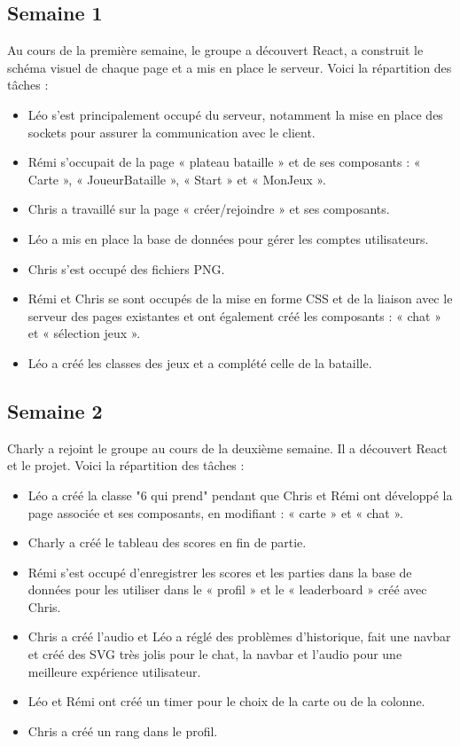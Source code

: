 \documentclass[a4paper]{article}
\begin{document}
\subsection{Semaine 1}

Au cours de la première semaine, le groupe a découvert React, a construit le schéma visuel de chaque page et a mis en place le serveur. Voici la répartition des tâches :

\begin{itemize}
\item Léo s'est principalement occupé du serveur, notamment la mise en place des sockets pour assurer la communication avec le client.
\item Rémi s'occupait de la page « plateau bataille » et de ses composants : « Carte », « JoueurBataille », « Start » et « MonJeux ».
\item Chris a travaillé sur la page « créer/rejoindre » et ses composants.
\item Léo a mis en place la base de données pour gérer les comptes utilisateurs.
\item Chris s'est occupé des fichiers PNG.
\item Rémi et Chris se sont occupés de la mise en forme CSS et de la liaison avec le serveur des pages existantes et ont également créé les composants : « chat » et « sélection jeux ».
\item Léo a créé les classes des jeux et a complété celle de la bataille.
\end{itemize}

\subsection{Semaine 2}

Charly a rejoint le groupe au cours de la deuxième semaine. Il a découvert React et le projet. Voici la répartition des tâches :

\begin{itemize}
\item Léo a créé la classe "6 qui prend" pendant que Chris et Rémi ont développé la page associée et ses composants, en modifiant : « carte » et « chat ».
\item Charly a créé le tableau des scores en fin de partie.
\item Rémi s'est occupé d'enregistrer les scores et les parties dans la base de données pour les utiliser dans le « profil » et le « leaderboard » créé avec Chris.
\item Chris a créé l'audio et Léo a réglé des problèmes d'historique, fait une navbar et créé des SVG très jolis pour le chat, la navbar et l'audio pour une meilleure expérience utilisateur.
\item Léo et Rémi ont créé un timer pour le choix de la carte ou de la colonne.
\item Chris a créé un rang dans le profil.
\end{itemize}
\end{document}
